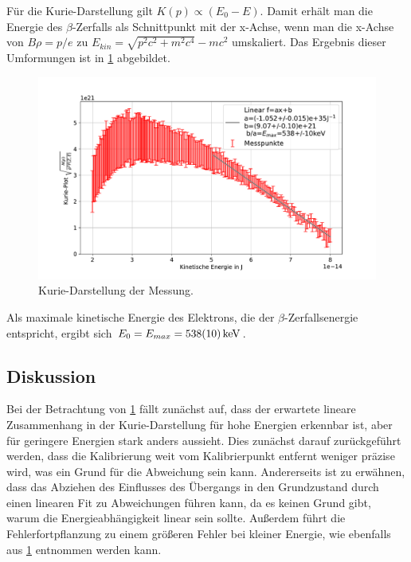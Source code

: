 \documentclass[
	a4paper,
	12pt,
	pagesize,
	ngerman
]{scrartcl}
\begin{document}
	Für die Kurie-Darstellung gilt $K(p)\propto (E_0-E)$.
	Damit erhält man die Energie des $\beta$-Zerfalls als Schnittpunkt mit der x-Achse, wenn man die x-Achse von $B\rho=p/e$ zu $E_{kin}=\sqrt{p^2c^2+m^2c^4}-mc^2$ umskaliert.
	Das Ergebnis dieser Umformungen ist in \cref{fg_kurie} abgebildet.
	\begin{figure}[H]
			\includegraphics[width=  \linewidth]{img/kurie}
			\caption{
			Kurie-Darstellung der Messung.
			}
			\label{fg_kurie}
	\end{figure}
	Als maximale kinetische Energie des Elektrons, die der $\beta$-Zerfallsenergie entspricht, ergibt sich $E_0=E_{max}=\SI{538+-10}{keV}$.
	\subsection{Diskussion}
	Bei der Betrachtung von \cref{fg_kurie} fällt zunächst auf, dass der erwartete lineare Zusammenhang in der Kurie-Darstellung für hohe Energien erkennbar ist, aber für geringere Energien stark anders aussieht.
	Dies zunächst darauf zurückgeführt werden, dass die Kalibrierung weit vom Kalibrierpunkt entfernt weniger präzise wird, was ein Grund für die Abweichung sein kann.
	Andererseits ist zu erwähnen, dass das Abziehen des Einflusses des Übergangs in den Grundzustand durch einen linearen Fit zu Abweichungen führen kann, da es keinen Grund gibt, warum die Energieabhängigkeit linear sein sollte.
	Außerdem führt die Fehlerfortpflanzung zu einem größeren Fehler bei kleiner Energie, wie ebenfalls aus \cref{fg_kurie} entnommen werden kann.
\end{document}
